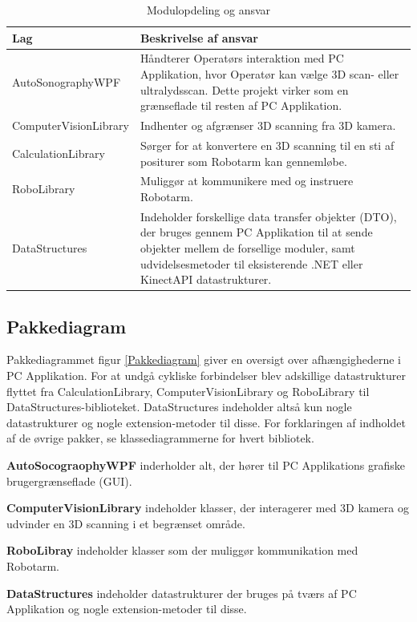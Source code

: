 \begin{table}[htb]
\begin{tabular}{ | l | p{} | }
\hline
\textbf{Lag} & \textbf{Beskrivelse af ansvar} \\\hline
AutoSonographyWPF & Håndterer Operatørs interaktion med PC Applikation, hvor Operatør kan vælge 3D scan- eller ultralydsscan. Dette projekt virker som en grænseflade til resten af PC Applikation.\\\hline
ComputerVisionLibrary & Indhenter og afgrænser 3D scanning fra 3D kamera. \\\hline
CalculationLibrary & Sørger for at konvertere en 3D scanning til en sti af positurer som Robotarm kan gennemløbe. \\\hline
RoboLibrary & Muliggør at kommunikere med og instruere Robotarm.\\\hline
DataStructures & Indeholder forskellige data transfer objekter (DTO), der bruges gennem PC Applikation til at sende objekter mellem de forsellige moduler, samt udvidelsesmetoder til eksisterende .NET eller KinectAPI datastrukturer.\\\hline
\end{tabular}
\caption{Modulopdeling og ansvar}
\end{table}

\newpage
\subsection{Pakkediagram}
Pakkediagrammet figur \ref{Pakkediagram} giver en oversigt over afhængighederne i PC Applikation.
For at undgå cykliske forbindelser blev adskillige datastrukturer flyttet fra CalculationLibrary, ComputerVisionLibrary og RoboLibrary til DataStructures-biblioteket.
DataStructures indeholder altså kun nogle datastrukturer og nogle extension-metoder til disse. 
For forklaringen af indholdet af de øvrige pakker, se klassediagrammerne for hvert bibliotek.

\textbf{AutoSocograophyWPF} inderholder alt, der hører til PC Applikations grafiske brugergrænseflade (GUI).

\textbf{ComputerVisionLibrary} indeholder klasser, der interagerer med 3D kamera og udvinder en 3D scanning i et begrænset område.

\textbf{RoboLibray} indeholder klasser som der muliggør kommunikation med Robotarm. 

\textbf{DataStructures} indeholder datastrukturer der bruges på tværs af PC Applikation og nogle extension-metoder til disse. 

